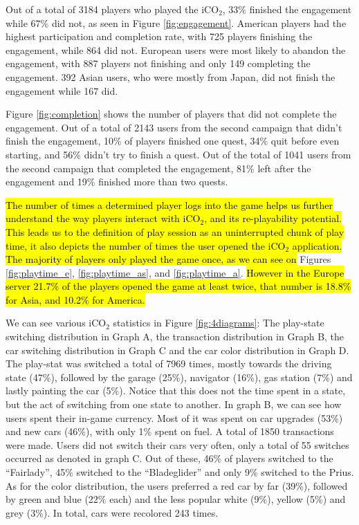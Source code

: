 \documentclass[preprint,authoryear,12pt]{elsarticle}
\newcommand{\hlc}[2][yellow]{ {\sethlcolor{#1} \hl{#2}} }
\begin{document}
Out of a total of 3184 players who played the iCO$_2$, 33\% finished the engagement while 67\% did not, as seen in Figure \ref{fig:engagement}. American players had the highest participation and completion rate, with 725 players finishing the engagement, while 864 did not. European users were most likely to abandon the engagement, with 887 players not finishing and only 149 completing the engagement. 392 Asian users, who were mostly from Japan, did not finish the engagement while 167 did.

Figure \ref{fig:completion} shows the number of players that did not complete the engagement. Out of a total of 2143 users from the second campaign that didn't finish the engagement, 10\% of players finished one quest, 34\% quit before even starting, and 56\% didn't try to finish a quest. Out of the total of 1041 users from the second campaign that completed the engagement, 81\% left after the engagement and 19\% finished more than two quests.


\hlc[green]
{The number of times a determined player logs into the game helps us further understand the way players interact with iCO$_2$, and its re-playability potential. This leads us to the definition of play session as an uninterrupted chunk of play time, it also depicts the number of times the user opened the iCO$_2$ application. The majority of players only played the game once, as we can see on }Figures \ref{fig:playtime_e}, \ref{fig:playtime_as}, and \ref{fig:playtime_a}. 
\hlc[green]{However in the Europe server 21.7\% of the players opened the  game at least twice, that number is 18.8\% for Asia, and 10.2\% for America.}





We can see various iCO$_2$ statistics in Figure \ref{fig:4diagrams}: The play-state switching distribution in Graph A, the transaction distribution in Graph B, the car switching distribution in Graph C and the car color distribution in Graph D. The play-stat was switched a total of 7969 times, mostly towards the driving state (47\%), followed by the garage (25\%), navigator (16\%), gas station (7\%) and lastly painting the car (5\%). Notice that this does not the time spent in a state, but the act of switching from one state to another. In graph B, we can see how users spent their in-game currency. Most of it was spent on car upgrades (53\%) and new cars (46\%), with only 1\% spent on fuel. A total of 1850 transactions were made. Users did not switch their cars very often, only a total of 55 switches occurred as denoted in graph C. Out of these, 46\% of players switched to the ``Fairlady'', 45\% switched to the ``Bladeglider'' and only 9\% switched to the Prius. As for the color distribution, the users preferred a red car by far (39\%), followed by green and blue (22\% each) and the less popular white (9\%), yellow (5\%) and grey (3\%). In total, cars were recolored 243 times.
\end{document}
